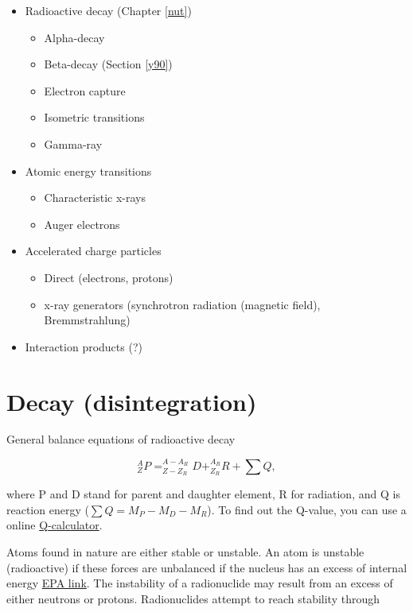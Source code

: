 \documentclass[]{book}
\providecommand{\tightlist}{%
  \setlength{\itemsep}{0pt}\setlength{\parskip}{0pt}}
\theoremstyle{definition}
\theoremstyle{definition}
\theoremstyle{definition}
\theoremstyle{remark}
\begin{document}
\begin{itemize}
\tightlist
\item
  Radioactive decay (Chapter \ref{nut})

  \begin{itemize}
  \tightlist
  \item
    Alpha-decay
  \item
    Beta-decay (Section \ref{y90})
  \item
    Electron capture
  \item
    Isometric transitions
  \item
    Gamma-ray
  \end{itemize}
\item
  Atomic energy transitions

  \begin{itemize}
  \tightlist
  \item
    Characteristic x-rays
  \item
    Auger electrons
  \end{itemize}
\item
  Accelerated charge particles

  \begin{itemize}
  \tightlist
  \item
    Direct (electrons, protons)
  \item
    x-ray generators (synchrotron radiation (magnetic field),
    Bremmstrahlung)
  \end{itemize}
\item
  Interaction products (?)
\end{itemize}

\section{Decay (disintegration)}\label{decays}

General balance equations of radioactive decay

\begin{equation}
 _Z^A P = ^{A-A_R}_{Z-Z_R}D + _{Z_R}^{A_R}R + \sum Q, 
\end{equation}

where P and D stand for parent and daughter element, R for radiation,
and Q is reaction energy (\(\sum Q = M_P-M_D-M_R\)). To find out the
Q-value, you can use a online
\href{http://www.nndc.bnl.gov/qcalc/}{Q-calculator}.

Atoms found in nature are either stable or unstable. An atom is unstable
(radioactive) if these forces are unbalanced if the nucleus has an
excess of internal energy
\href{http://www.epa.gov/radiation/understand/radiation.html}{EPA link}.
The instability of a radionuclide may result from an excess of either
neutrons or protons. Radionuclides attempt to reach stability through
\end{document}
